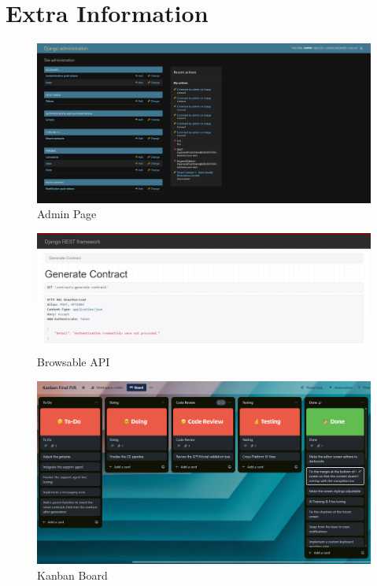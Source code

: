 \chapter{Extra Information}

\begin{figure}[!ht]
    \centering
    \includegraphics[width=0.5\linewidth]{LATEX/Appendices/Images/Software/Backend/admin_page.png}
    \caption{Admin Page}
    \label{fig:admin-page}
\end{figure}

\begin{figure}[!ht]
    \centering
    \includegraphics[width=0.5\linewidth]{LATEX/Appendices/Images/Software/Backend/browsable_API.png}
    \caption{Browsable API}
    \label{fig:browsable-api}
\end{figure}

\begin{figure}[!ht]
    \centering
    \includegraphics[width=0.5\linewidth]{LATEX/Appendices/Images/Software/kanban_board.png}
    \caption{Kanban Board}
    \label{fig:kanban-board}
\end{figure}